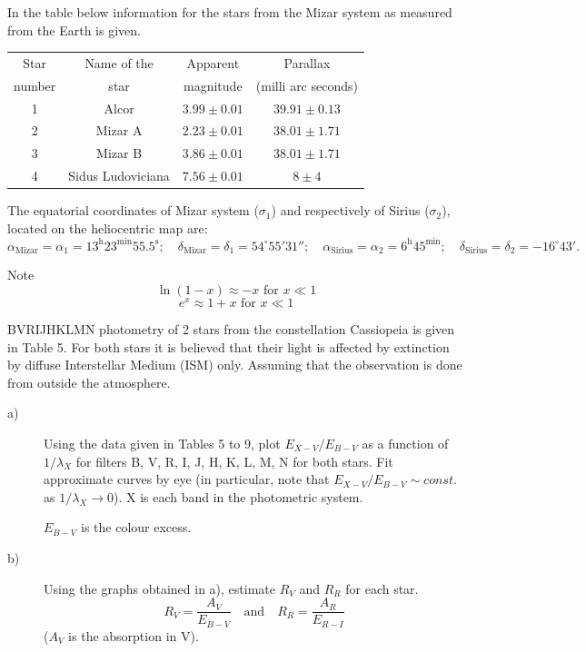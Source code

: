 In the table below information for the stars from the Mizar system as
measured from the Earth is given.

\begin{center}
\begin{tabular}{cccc}
\hline
Star & Name of the & Apparent & Parallax \\
number & star & magnitude & (milli arc seconds) \\
\hline
1 & Alcor & $3.99 \pm 0.01$ & $39.91 \pm 0.13$ \\
2 & Mizar A & $2.23 \pm 0.01$ & $38.01 \pm 1.71$ \\
3 & Mizar B & $3.86 \pm 0.01$ & $38.01 \pm 1.71$ \\
4 & Sidus Ludoviciana & $7.56 \pm 0.01$ & $8 \pm 4$ \\
\hline
\end{tabular}
\end{center}

The equatorial coordinates of Mizar system ($\sigma_1$) and respectively of
Sirius ($\sigma_2$), located on the heliocentric map are:
\[ \alpha_{\mathrm{Mizar}} = \alpha_1 =
   13^{\mathrm{h}}23^{\mathrm{min}}55.5^{\mathrm{s}}; \quad
   \delta_{\mathrm{Mizar}} = \delta_1 = 54^\circ 55' 31''; \quad
   \alpha_{\mathrm{Sirius}} = \alpha_2 = 6^{\mathrm{h}}45^{\mathrm{min}};
   \quad
   \delta_{\mathrm{Sirius}} = \delta_2 = -16^\circ 43'. \]

Note
\[ \ln(1-x) \approx -x \text{ for } x \ll 1 \]
\[ e^x \approx 1 + x \text{ for } x \ll 1 \]

BVRIJHKLMN photometry of 2 stars from the constellation Cassiopeia is given in
Table 5. For both stars it is believed that their light is affected by
extinction by diffuse Interstellar Medium (ISM) only. Assuming that the
observation is done from outside the atmosphere.

\begin{description}
\item[a)] Using the data given in Tables 5 to 9, plot $E_{X-V}/E_{B-V}$ as a
  function of $1/\lambda_X$ for filters B, V, R, I, J, H, K, L, M, N for both
  stars. Fit approximate curves by eye (in particular, note that
  $E_{X-V}/E_{B-V} \sim \mathit{const.}$ as $1/\lambda_X \to 0$). X is each
  band in the photometric system.

  $E_{B-V}$ is the colour excess.
\item[b)] Using the graphs obtained in a), estimate $R_V$ and $R_R$ for each
  star.
  \[ R_V = \frac{A_V}{E_{B-V}} \quad \text{and} \quad
     R_R = \frac{A_R}{E_{R-I}} \]
  ($A_V$ is the absorption in V).
\end{description}

